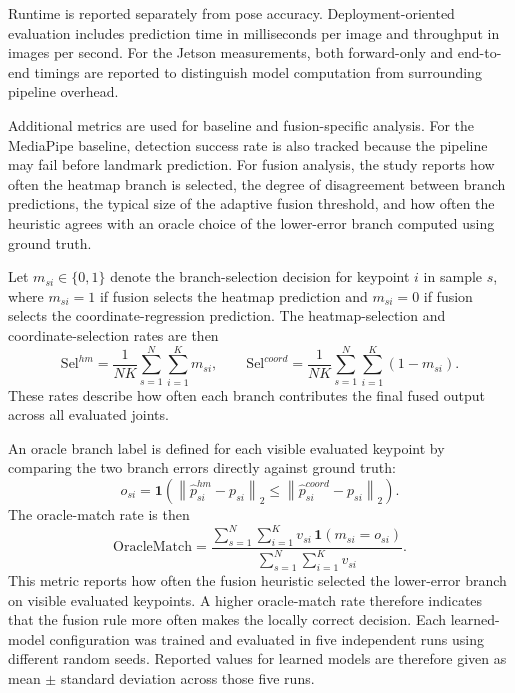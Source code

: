 ﻿\documentclass[10pt,letterpaper]{article}
\begin{document}
\medskip
\noindent
Runtime is reported separately from pose accuracy. Deployment-oriented evaluation includes prediction time in milliseconds per image and throughput in images per second. For the Jetson measurements, both forward-only and end-to-end timings are reported to distinguish model computation from surrounding pipeline overhead.

\medskip
\noindent
Additional metrics are used for baseline and fusion-specific analysis. For the MediaPipe baseline, detection success rate is also tracked because the pipeline may fail before landmark prediction. For fusion analysis, the study reports how often the heatmap branch is selected, the degree of disagreement between branch predictions, the typical size of the adaptive fusion threshold, and how often the heuristic agrees with an oracle choice of the lower-error branch computed using ground truth.

Let \(m_{si} \in \{0,1\}\) denote the branch-selection decision for keypoint \(i\) in sample \(s\), where \(m_{si}=1\) if fusion selects the heatmap prediction and \(m_{si}=0\) if fusion selects the coordinate-regression prediction. The heatmap-selection and coordinate-selection rates are then
\begin{equation}
\mathrm{Sel}^{hm} =
\frac{1}{NK}
\sum_{s=1}^{N}\sum_{i=1}^{K} m_{si},
\qquad
\mathrm{Sel}^{coord} =
\frac{1}{NK}
\sum_{s=1}^{N}\sum_{i=1}^{K} (1-m_{si}).
\label{eq:selection-rates}
\end{equation}
These rates describe how often each branch contributes the final fused output across all evaluated joints.

An oracle branch label is defined for each visible evaluated keypoint by comparing the two branch errors directly against ground truth:
\begin{equation}
o_{si} =
\mathbf{1}
\left(
\left\|
\hat{p}^{hm}_{si} - p_{si}
\right\|_2
\le
\left\|
\hat{p}^{coord}_{si} - p_{si}
\right\|_2
\right).
\label{eq:oracle-label}
\end{equation}
The oracle-match rate is then
\begin{equation}
\mathrm{OracleMatch} =
\frac{
\sum_{s=1}^{N}\sum_{i=1}^{K}
v_{si}\,\mathbf{1}(m_{si}=o_{si})
}{
\sum_{s=1}^{N}\sum_{i=1}^{K} v_{si}
}.
\label{eq:oracle-match}
\end{equation}
This metric reports how often the fusion heuristic selected the lower-error branch on visible evaluated keypoints. A higher oracle-match rate therefore indicates that the fusion rule more often makes the locally correct decision.
Each learned-model configuration was trained and evaluated in five independent runs using different random seeds. Reported values for learned models are therefore given as mean \(\pm\) standard deviation across those five runs.
\end{document}
